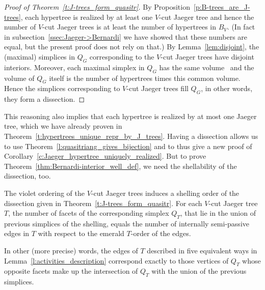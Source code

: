 \documentclass[ALCO,ThmDefs,Unicode,epreuves]{cedram}
\begin{document}
\begin{proof}[Proof of Theorem~\ref{t:J-trees_form_quasitr}]
 By Proposition~\ref{p:B-trees_are_J-trees}, each hypertree is realized by at least one $V$-cut Jaeger tree and hence the number of $V$-cut Jaeger trees is at least the number of hypertrees in $B_V$. (In fact in subsection~\ref{ssec:Jaeger->Bernardi} we have showed that these numbers are equal, but the present proof does not rely on that.) By Lemma~\ref{lem:disjoint}, the (maximal) simplices in $Q_G$ corresponding to the $V$-cut Jaeger trees have disjoint interiors. Moreover, each maximal simplex in $Q_G$ has the same volume~\cite[Section~12]{alex} and the volume of $Q_G$ itself is the number of hypertrees times this common volume. Hence the simplices corresponding to $V$-cut Jaeger trees fill $Q_G$, in other words, they form a dissection. 
\end{proof}

This reasoning also implies that each hypertree is realized by at most one Jaeger tree, which we have already proven in Theorem~\ref{t:hypertrees_unique_repr_by_J_trees}. Having a dissection allows us to use Theorem~\ref{l:quasitriang_gives_bijection} and to thus give a new proof of Corollary~\ref{c:Jaeger_hypertree_uniquely_realized}. But to prove Theorem~\ref{thm:Bernardi-interior_well_def}, we need the shellability of the dissection, too.

\begin{theo}\label{thm:shelling}
The violet ordering of the $V$-cut Jaeger trees induces a shelling order of the dissection given in Theorem~\ref{t:J-trees_form_quasitr}. For each $V$-cut Jaeger tree $T$, the number of facets of the corresponding simplex $Q_{T}$, that lie in the union of previous simplices of the shelling, equals the number of internally semi-passive edges in $T$ with respect to the emerald $T$-order of the edges.
\end{theo}

In other (more precise) words, the edges of $T$ described in five equivalent ways in Lemma~\ref{l:activities_description} correspond exactly to those vertices of $Q_T$ whose opposite facets make up the intersection of $Q_T$ with the union of the previous simplices.
\end{document}
